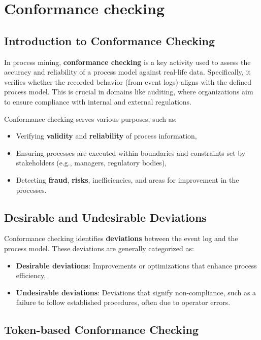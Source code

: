 \chapter{Conformance checking}
\section{Introduction to Conformance Checking}

In process mining, \textbf{conformance checking} is a key activity used to assess the accuracy and reliability of a process model against real-life data. Specifically, it verifies whether the recorded behavior (from event logs) aligns with the defined process model. This is crucial in domains like auditing, where organizations aim to ensure compliance with internal and external regulations.

Conformance checking serves various purposes, such as:
\begin{itemize}
    \item Verifying \textbf{validity} and \textbf{reliability} of process information,
    \item Ensuring processes are executed within boundaries and constraints set by stakeholders (e.g., managers, regulatory bodies),
    \item Detecting \textbf{fraud}, \textbf{risks}, inefficiencies, and areas for improvement in the processes.
\end{itemize}

\section{Desirable and Undesirable Deviations}

Conformance checking identifies \textbf{deviations} between the event log and the process model. These deviations are generally categorized as:
\begin{itemize}
    \item \textbf{Desirable deviations}: Improvements or optimizations that enhance process efficiency,
    \item \textbf{Undesirable deviations}: Deviations that signify non-compliance, such as a failure to follow established procedures, often due to operator errors.
\end{itemize}

\section{Token-based Conformance Checking}

